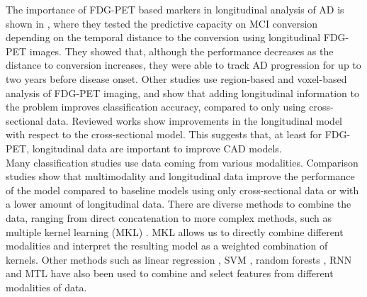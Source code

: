 The importance of FDG-PET based markers in longitudinal analysis of AD is shown in \cite{Cabral2015}, where they tested the predictive capacity on MCI conversion depending on the temporal distance to the conversion using longitudinal FDG-PET images. They showed that, although the performance decreases as the distance to conversion increases, they were able to track AD progression for up to two years before disease onset. Other studies use region-based \cite{Chen2011b,Gray2012} and voxel-based \cite{Rodrigues2014} analysis of FDG-PET imaging, and show that adding longitudinal information to the problem improves classification accuracy, compared to only using cross-sectional data. Reviewed works show improvements in the longitudinal model with respect to the cross-sectional model. This suggests that, at least for FDG-PET, longitudinal data are important to improve CAD models.\\

Many classification studies use data coming from various modalities. Comparison studies \cite{Hinrichs2011,Mubeen2017,Zhang2012a} show that multimodality and longitudinal data improve the performance of the model compared to baseline models using only cross-sectional data or with a lower amount of longitudinal data. There are diverse methods to combine the data, ranging from direct concatenation \cite{Aghili2018} to more complex methods, such as multiple kernel learning (MKL) \cite{Gonen2011}. MKL allows us to directly combine different modalities and interpret the resulting model as a weighted combination of kernels. Other methods such as linear regression \cite{Minhas2016}, SVM \cite{Minhas2018}, random forests \cite{Ardekani2016,Mubeen2017}, RNN \cite{Aghili2018} and MTL \cite{Thung2018} have also been used to combine and select features from different modalities of data.  \\

